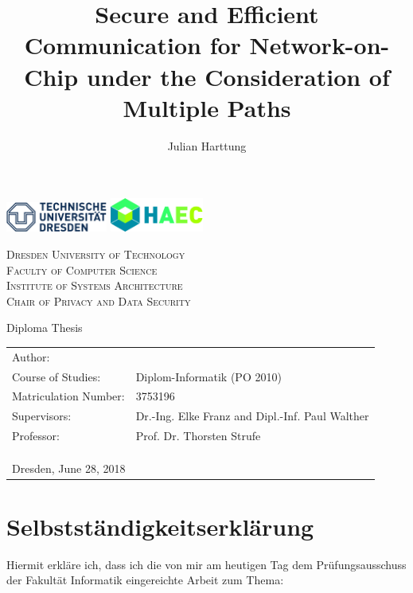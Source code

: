 \documentclass[
	paper=a4,
	open=right, %
	twoside=true,
	fontsize=11pt,
	parskip=full %
]{scrreprt}
\author{Julian Harttung}
\title{Secure and Efficient Communication for Network-on-Chip under the Consideration of Multiple Paths}
\newcommand{\thesubtitle}{Diploma Thesis}
\newcommand{\theuniversity}{Dresden University of Technology}
\newcommand{\thefaculty}{Faculty of Computer Science}
\newcommand{\theinstitute}{Institute of Systems Architecture}
\newcommand{\thechair}{Chair of Privacy and Data Security}
\begin{document}
    \frenchspacing %
	\begin{titlepage}
		\includegraphics[width=0.25\textwidth]{TU_Dresden_Logo_blau_HKS41}
		\hfill
		\includegraphics[width=0.23\textwidth]{HAEC_Logo_cmyk}
		\vspace{1.5\baselineskip}
		
		\begin{center}
			\textsc{\theuniversity \\
					\thefaculty \\
					\theinstitute \\
					\thechair}
			\vspace{2.5\baselineskip}
		
			\Huge{\thetitle}
			\vspace{.5\baselineskip}
			
			\LARGE{\thesubtitle}
		\end{center}
		
		\vfill
		
		\begin{tabular}{ll}
			Author:               & \theauthor \\
			Course of Studies:    & Diplom-Informatik (PO 2010)\\
			Matriculation Number: & 3753196 \\
			Supervisors:          & Dr.-Ing. Elke Franz and Dipl.-Inf. Paul Walther \\
			Professor:            & Prof. Dr. Thorsten Strufe \\
			\multicolumn{2}{l}{ } \\
			\multicolumn{2}{l}{ } \\
			\multicolumn{2}{l}{ } \\
			\multicolumn{2}{l}{Dresden, June 28, 2018}
		\end{tabular}
	\end{titlepage}
	
	
	
    
	
    \chapter*{Selbstständigkeitserklärung}
    Hiermit erkläre ich, dass ich die von mir am heutigen Tag dem Prüfungsausschuss der Fakultät Informatik eingereichte Arbeit zum Thema:
    \begin{adjustwidth}{0.15\textwidth}{0.15\textwidth}
        \begin{center}
            \textit{\thetitle}
        \end{center}
    \end{adjustwidth}
\end{document}
